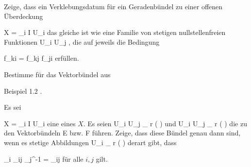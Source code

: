 {}
{





Zeige, dass ein Verklebungsdatum für ein Geradenbündel zu einer offenen Überdeckung

\mavergleichskette
{\vergleichskette
{X
}
{ = }{ \bigcup_{i \in I} U_i
}
{  }{
}
{    }{
}
{   }{
}
}
{}{}{}
das gleiche ist wie eine Familie von stetigen nullstellenfreien Funktionen
 {U_i \cap U_j } { \R
} {,}
die auf
 jeweils die Bedingung

\mavergleichskette
{\vergleichskette
{ f_{ki}
}
{ = }{ f_{kj} \cdot f_{ji}
}
{  }{
}
{    }{
}
{   }{
}
}
{}{}{}
erfüllen.





}
{} {}

{}
{





Bestimme
für das Vektorbündel aus

Beispiel 1.2
.





}
{} {}

{}
{





Es sei

\mavergleichskette
{\vergleichskette
{X
}
{ = }{ \bigcup_{i \in I} U_i
}
{  }{
}
{    }{
}
{   }{
}
}
{}{}{}
eine
eines
$X$. Es seien
 {U_i \cap U_j } { _{  r   } \! \left(  \R  \right)
} {}
und
 {U_i \cap U_j } { _{  r   } \! \left(  \R  \right)
} {}
die zu den Vektorbündeln
\mathkor {} {E} {bzw.} {F} {}
führen. Zeige, dass diese Bündel genau dann
sind, wenn es stetige Abbildungen
 { U_i } { _{  r   } \! \left(  \R  \right)
} {}
derart gibt, dass
 {} {}

\mavergleichskettedisp
{\vergleichskette
{ \alpha_i \circ  \varphi_{ij}  \circ \alpha_j^{-1}
}
{ =} { \psi_{ij}
}
{ } {
}
{ } {
}
{ } {
}
}
{}{}{}
für alle $i,j$ gilt.





}
{} {}

